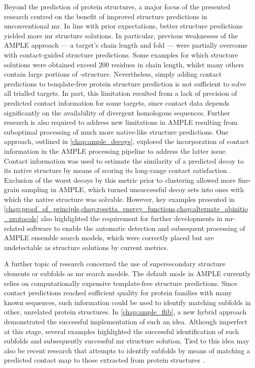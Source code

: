 Beyond the prediction of protein structures, a major focus of the presented research centred on the benefit of improved structure predictions in unconventional \gls{mr}. In line with prior expectations, better structure predictions yielded more \gls{mr} structure solutions. In particular, previous weaknesses of the AMPLE approach --- a target's chain length and fold --- were partially overcome with contact-guided structure predictions. Some examples for which structure solutions were obtained exceed 200 residues in chain length, whilst many others contain large portions of \textbeta-structure. Nevertheless, simply adding contact predictions to template-free protein structure prediction is not sufficient to solve all trialled targets. In part, this limitation resulted from a lack of precision of predicted contact information for some targets, since contact data depends significantly on the availability of divergent homologous sequences. Further research is also required to address new limitations in AMPLE resulting from suboptimal processing of much more native-like structure predictions. One approach, outlined in \cref{chap:ample_decoys}, explored the incorporation of contact information in the AMPLE processing pipeline to address the latter issue. Contact information was used to estimate the similarity of a predicted decoy to its native structure by means of scoring its long-range contact satisfaction \cite{Kosciolek2014-bt,De_Oliveira2016-gj,Adhikari2018-lj}. Exclusion of the worst decoys by this metric prior to clustering allowed more fine-grain sampling in AMPLE, which turned unsuccessful decoy sets into ones with which the native structure was solvable. However, key examples presented in \cref{chap:proof_of_principle,chap:rosetta_energy_functions,chap:alternate_abinitio_protocols} also highlighted the requirement for further developments in \gls{mr}-related software to enable the automatic detection and subsequent processing of AMPLE ensemble search models, which were correctly placed but are undetectable as structure solutions by current metrics.

A further topic of research concerned the use of supersecondary structure elements or subfolds as \gls{mr} search models. The default mode in AMPLE currently relies on computationally expensive template-free structure predictions. Since contact predictions reached sufficient quality for protein families with many known sequences, such information could be used to identify matching subfolds in other, unrelated protein structures. In \cref{chap:ample_flib}, a new hybrid approach demonstrated the successful implementation of such an idea. Although imperfect at this stage, several examples highlighted the successful identification of such subfolds and subsequently successful \gls{mr} structure solution. Tied to this idea may also be recent research that attempts to identify subfolds by means of matching a predicted contact map to those extracted from protein structures \cite{Buchan2017-ox,Ovchinnikov2017-nd}.


